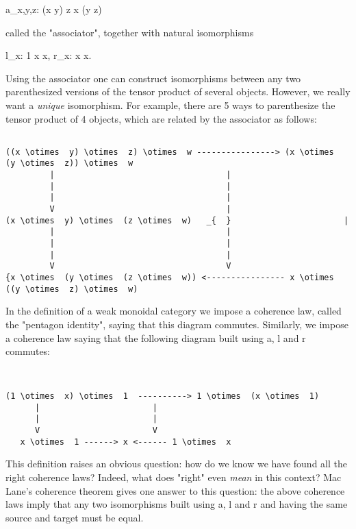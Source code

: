 a_{x,y,z}: (x \otimes  y) \otimes  z \to  x \otimes  (y \otimes  z)  

called the "associator", together with natural isomorphisms

            l_{x}: 1 \otimes  x \to  x, 
            r_{x}: x  \to  x. 

Using the associator one can construct isomorphisms between any two
parenthesized versions of the tensor product of several objects.
However, we really want a \emph{unique} isomorphism.  For example, there
are 5 ways to parenthesize the tensor product of 4 objects, which are
related by the associator as follows:


\begin{verbatim}

((x \otimes  y) \otimes  z) \otimes  w ----------------> (x \otimes  (y \otimes  z)) \otimes  w
         |                                   |
         |                                   |
         |                                   |
         V                                   |
(x \otimes  y) \otimes  (z \otimes  w)   _{  }                       |
         |                                   |
         |                                   |
         |                                   |
         V                                   V
{x \otimes  (y \otimes  (z \otimes  w)) <---------------- x \otimes  ((y \otimes  z) \otimes  w)

\end{verbatim}
    
In the definition of a weak monoidal category we impose a coherence
law, called the "pentagon identity", saying that this diagram
commutes.  Similarly, we impose a coherence law saying that the
following diagram built using a, l and r commutes:


\begin{verbatim}


(1 \otimes  x) \otimes  1  ----------> 1 \otimes  (x \otimes  1)
      |                       |
      |                       | 
      V                       V
   x \otimes  1 ------> x <------ 1 \otimes  x

\end{verbatim}
    
This definition raises an obvious question: how do we know we have
found all the right coherence laws?  Indeed, what does "right" even
\emph{mean} in this context?  Mac Lane's coherence theorem gives one answer
to this question: the above coherence laws imply that any two
isomorphisms built using a, l and r and having the same source and
target must be equal.

